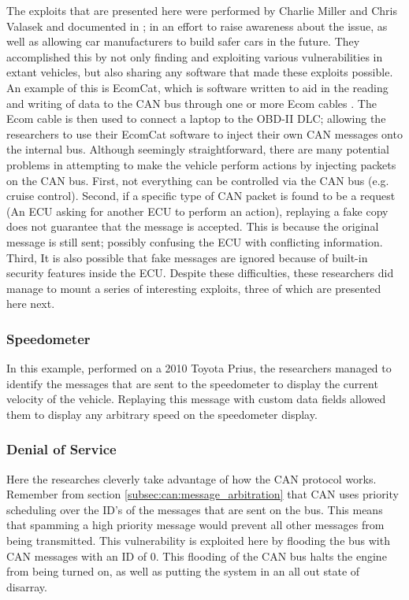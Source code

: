 The exploits that are presented here were performed by Charlie Miller and Chris Valasek and documented in \cite{MillerC}; in an effort to raise awareness about the issue, as well as allowing car manufacturers to build safer cars in the future. They accomplished this by not only finding and exploiting various vulnerabilities in extant vehicles, but also sharing any software that made these exploits possible. An example of this is EcomCat, which is software written to aid in the reading and writing of data to the CAN bus through one or more Ecom cables \cite{MillerC}. The Ecom cable is then used to connect a laptop to the OBD-II DLC; allowing the researchers to use their EcomCat software to inject their own CAN messages onto the internal bus. Although seemingly straightforward, there are many potential problems in attempting to make the vehicle perform actions by injecting packets on the CAN bus. First, not everything can be controlled via the CAN bus (e.g. cruise control). Second, if a specific type of CAN packet is found to be a request (An ECU asking for another ECU to perform an action), replaying a fake copy does not guarantee that the message is accepted. This is because the original message is still sent; possibly confusing the ECU with conflicting information. Third, It is also possible that fake messages are ignored because of built-in security features inside the ECU. Despite these difficulties, these researchers did manage to mount a series of interesting exploits, three of which are presented here next.

\subsubsection{Speedometer} 
\label{subsubsec:speedometer}

In this example, performed on a 2010 Toyota Prius, the researchers managed to identify the messages that are sent to the speedometer to display the current velocity of the vehicle. Replaying this message with custom data fields allowed them to display any arbitrary speed on the speedometer display.

\subsubsection{Denial of Service} 
\label{subsubsec:denial_of_service}

Here the researches cleverly take advantage of how the CAN protocol works. Remember from section \ref{subsec:can:message_arbitration} that CAN uses priority scheduling over the ID's of the messages that are sent on the bus. This means that spamming a high priority message would prevent all other messages from being transmitted. This vulnerability is exploited here by flooding the bus with CAN messages with an ID of 0. This flooding of the CAN bus halts the engine from being turned on, as well as putting the system in an all out state of disarray.

